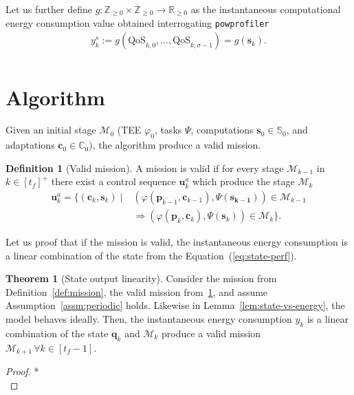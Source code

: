 \documentclass[letterpaper,10pt,conference]{ieeeconf}
\newcommand{\stt}[1]{{\small\tt #1}} %
\newcommand{\powprof}{\stt{powprofiler}}
\theoremstyle{definition}
\newtheorem{thm}{Theorem}[section]
\newtheorem{defn}{Definition}[section]
\begin{document}
Let us further define $g:\mathbb{Z}_{\geq 0}\times\mathbb{Z}_{\geq 0}\rightarrow\mathbb{R}_{\geq 0}$ as the instantaneous computational energy consumption value obtained interrogating \powprof{}
\begin{equation}\label{eq:energy-comp}\begin{split}
  y_k^s:=g\left(\text{QoS}_{k,0},\dots,\text{QoS}_{k,\sigma-1}\right)=g\left(\mathbf{s}_{k}\right).\\
\end{split}\end{equation}


\section{Algorithm}
\label{sec:algo}

Given an initial stage $\mathcal{M}_0$ (TEE $\varphi_0$, tasks $\Psi$, computations $\mathbf{s}_0\in\mathbb{S}_0$, and adaptations $\mathbf{c}_0\in\mathbb{C}_0$), the algorithm produce a valid mission.

\begin{defn}[Valid mission]\label{def:valid}
  A mission is valid if for every stage $\mathcal{M}_{k-1}$ in $k\in[t_f]^+$ there exist a control sequence $\mathbf{u}_k^{a}$ which produce the stage $\mathcal{M}_k$
  \begin{equation}\begin{split}
    \mathbf{u}^a_{k}=\{(\mathbf{c}_{k},\mathbf{s}_{k})\mid&(\varphi(\mathbf{p}_{k-1},\mathbf{c}_{k-1}),\Psi(\mathbf{s_{k-1}}))\in\mathcal{M}_{k-1}\\
    &\Longrightarrow(\varphi(\mathbf{p}_{k},\mathbf{c}_{k}),\Psi(\mathbf{s}_{k}))\in\mathcal{M}_{k}\}.
  \end{split}\end{equation}
\end{defn}

Let us proof that if the mission is valid, the instantaneous energy consumption is a linear combination of the state from the Equation~(\ref{eq:state-perf}).

\begin{thm}[State output linearity]\label{thm:state-vs-energy}
  Consider the mission from Definition~\ref{def:mission}, the valid mission from~\ref{def:valid}, and assume Assumption~\ref{assm:periodic} holds. Likewise in Lemma~\ref{lem:state-vs-energy}, the model behaves ideally. 
  Then, the instantaneous energy consumption $y_k$ is a linear combination of the state $\mathbf{q}_k$ and $\mathcal{M}_k$ produce a valid mission $\mathcal{M}_{k+1}\,\forall k\in[t_f-1]$.
\end{thm}
\begin{proof}
  *\\
\end{proof}
\end{document}
